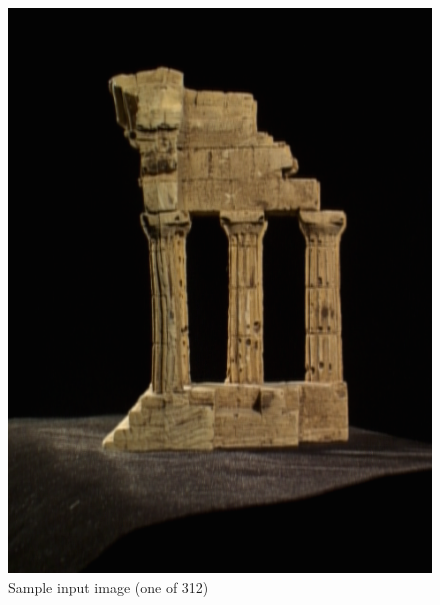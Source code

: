 \documentclass[10pt,twocolumn,letterpaper]{article}
\begin{document}





\begin{figure}[t]
  \begin{center}
    \includegraphics[width=0.8\linewidth]{temple0001.png}
  \end{center}
  \caption{Sample input image (one of 312)}
  \label{fig:long}
  \label{fig:onecol}
\end{figure}
\end{document}
